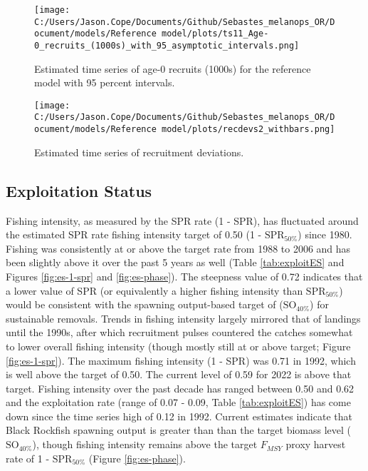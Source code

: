 \documentclass[11pt,
  letterpaper,
]{article}
\begin{document}


\clearpage

\begin{figure}
{\centering
\texttt{[image: C:/Users/Jason.Cope/Documents/Github/Sebastes\_melanops\_OR/Document/models/Reference model/plots/ts11\_Age-0\_recruits\_(1000s)\_with\_95\_asymptotic\_intervals.png]}
}
\caption{Estimated time series of age-0 recruits (1000s) for the reference model with 95 percent intervals.\label{fig:es-recruits}}
\end{figure}

\clearpage

\begin{figure}
{\centering
\texttt{[image: C:/Users/Jason.Cope/Documents/Github/Sebastes\_melanops\_OR/Document/models/Reference model/plots/recdevs2\_withbars.png]}
}
\caption{Estimated time series of recruitment deviations.\label{fig:es-recdev}}
\end{figure}

\clearpage

\hypertarget{exploitation-status}{%
\subsection*{Exploitation Status}\label{exploitation-status}}

Fishing intensity, as measured by the SPR rate (1 - SPR), has fluctuated around the estimated SPR rate fishing intensity target of 0.50 (1 - \(\text{SPR}_{50\%}\)) since 1980. Fishing was consistently at or above the target rate from 1988 to 2006 and has been slightly above it over the past 5 years as well (Table \ref{tab:exploitES} and Figures \ref{fig:es-1-spr} and \ref{fig:es-phase}). The steepness value of 0.72 indicates that a lower value of SPR (or equivalently a higher fishing intensity than \(\text{SPR}_{50\%}\)) would be consistent with the spawning output-based target of (\(\text{SO}_{40\%}\)) for sustainable removals. Trends in fishing intensity largely mirrored that of landings until the 1990s, after which recruitment pulses countered the catches somewhat to lower overall fishing intensity (though mostly still at or above target; Figure \ref{fig:es-1-spr}). The maximum fishing intensity (1 - SPR) was 0.71 in 1992, which is well above the target of 0.50. The current level of 0.59 for 2022 is above that target. Fishing intensity over the past decade has ranged between 0.50 and 0.62 and the exploitation rate (range of 0.07 - 0.09, Table \ref{tab:exploitES}) has come down since the time series high of 0.12 in 1992. Current estimates indicate that Black Rockfish spawning output is greater than than the target biomass level (\(\text{SO}_{40\%}\)), though fishing intensity remains above the target \(F_{MSY}\) proxy harvest rate of 1 - \(\text{SPR}_{50\%}\) (Figure \ref{fig:es-phase}).
\end{document}
